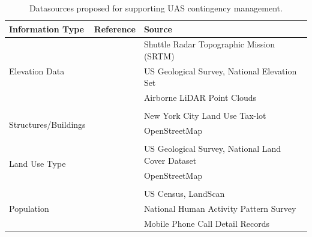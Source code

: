 \begin{table}[ht]
\centering
\caption{Datasources proposed for supporting UAS contingency management.}
\label{table:ch1_datasources}
\begin{tabular}{@{}lll@{}}
\toprule
Information Type & Reference & Source \\ 
\midrule
\multirow[t]{3}{*}{Elevation Data}                   & \cite{bleier_risk_2015, garg_terrain-based_2015} & Shuttle Radar Topographic Mission (SRTM) \\
                                                     &  \cite{ten_harmsel_emergency_2017} & US Geological Survey, National Elevation Set \\
                                                     &  \cite{frantis_emergency_2011, yan_safe_2020, maturana_3d_2015} & Airborne LiDAR Point Clouds \\
                                                     & & \\
                                                  
\multirow[t]{3}{*}{Structures/Buildings}            & \cite{ten_harmsel_emergency_2017} & New York City Land Use Tax-lot \\
                                                    & \cite{di_donato_evaluating_2017, bleier_risk_2015}  & OpenStreetMap \\
                                                    & & \\
                                                    
\multirow[t]{3}{*}{Land Use Type}                   & \cite{ten_harmsel_emergency_2017} & US Geological Survey, National Land Cover Dataset \\
                                                    & \cite{di_donato_evaluating_2017, bleier_risk_2015} & OpenStreetMap \\
                                                    & & \\
                                                  
\multirow[t]{3}{*}{Population}                      & \cite{ten_harmsel_emergency_2017, poissant_mitigation_2020} & US Census, LandScan \\
                                                    & \cite{melnyk_third-party_2014-1}  & National Human Activity Pattern Survey \\
                                                    & \cite{di_donato_evaluating_2017}  & Mobile Phone Call Detail Records \\
                                                  
\bottomrule
\end{tabular}
\end{table}

